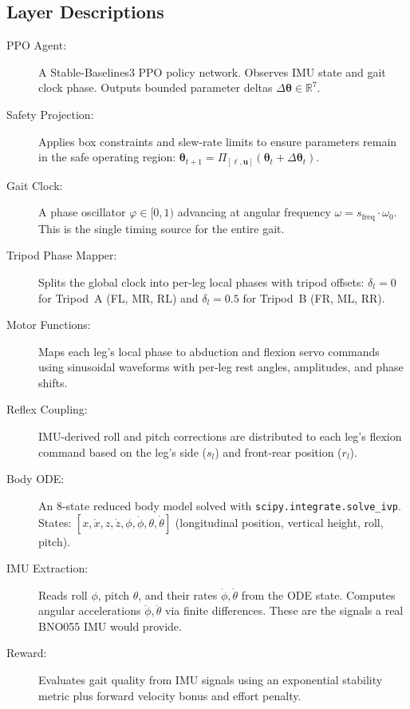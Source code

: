 \documentclass[11pt]{article}
\begin{document}
\subsection{Layer Descriptions}

\begin{description}
    \item[PPO Agent:] A Stable-Baselines3 PPO policy network. Observes IMU state and gait clock phase. Outputs bounded parameter deltas $\Delta\boldsymbol{\theta}\in\mathbb{R}^7$.
    \item[Safety Projection:] Applies box constraints and slew-rate limits to ensure parameters remain in the safe operating region: $\boldsymbol{\theta}_{t+1}=\Pi_{[\boldsymbol{\ell},\mathbf{u}]}(\boldsymbol{\theta}_t+\Delta\boldsymbol{\theta}_t)$.
    \item[Gait Clock:] A phase oscillator $\varphi\in[0,1)$ advancing at angular frequency $\omega=s_{\mathrm{freq}}\cdot\omega_0$. This is the single timing source for the entire gait.
    \item[Tripod Phase Mapper:] Splits the global clock into per-leg local phases with tripod offsets: $\delta_l=0$ for Tripod~A (FL, MR, RL) and $\delta_l=0.5$ for Tripod~B (FR, ML, RR).
    \item[Motor Functions:] Maps each leg's local phase to abduction and flexion servo commands using sinusoidal waveforms with per-leg rest angles, amplitudes, and phase shifts.
    \item[Reflex Coupling:] IMU-derived roll and pitch corrections are distributed to each leg's flexion command based on the leg's side ($s_l$) and front-rear position ($r_l$).
    \item[Body ODE:] An 8-state reduced body model solved with \texttt{scipy.integrate.solve\_ivp}. States: $[x, \dot{x}, z, \dot{z}, \phi, \dot{\phi}, \theta, \dot{\theta}]$ (longitudinal position, vertical height, roll, pitch).
    \item[IMU Extraction:] Reads roll $\phi$, pitch $\theta$, and their rates $\dot\phi,\dot\theta$ from the ODE state. Computes angular accelerations $\ddot\phi,\ddot\theta$ via finite differences. These are the signals a real BNO055 IMU would provide.
    \item[Reward:] Evaluates gait quality from IMU signals using an exponential stability metric plus forward velocity bonus and effort penalty.
\end{description}

\end{document}
